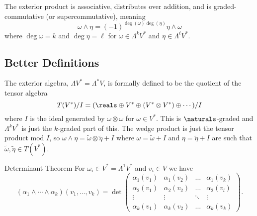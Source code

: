 \documentclass[fleqn]{NotesClass}
\begin{document}
    \begin{lma}{}{}
        The exterior product is associative, distributes over addition, and is graded-commutative (or supercommutative), meaning
        \begin{equation}
            \omega \wedge \eta = (-1)^{\deg(\omega) \deg(\eta)}\eta \wedge \omega
        \end{equation}
        where \(\deg \omega = k\) and \(\deg \eta = \ell\) for \(\omega \in \Lambda^kV^*\) and \(\eta \in \Lambda^\ell V^*\).
    \end{lma}
    
    \subsection{Better Definitions}
    The exterior algebra, \(\Lambda V^* = \Lambda^* V\), is formally defined to be the quotient of the tensor algebra
    \begin{equation}
        T(V^*)/I = (\reals \oplus V^* \oplus (V^* \otimes V^*) \oplus \dotsb)/I
    \end{equation}
    where \(I\) is the ideal generated by \(\omega \otimes \omega\) for \(\omega \in V^*\).
    This is \(\naturals\)-graded and \(\Lambda^kV^*\) is just the \(k\)-graded part of this.
    The wedge product is just the tensor product mod \(I\), so \(\omega \wedge \eta = \tilde{\omega} \otimes \tilde{\eta} + I\) where \(\omega = \tilde{\omega} + I\) and \(\eta = \tilde{\eta} + I\) are such that \(\tilde{\omega}, \tilde{\eta} \in T(V^*)\).
    
    \begin{thm}{Determinant Theorem}{}
        For \(\omega_i \in V^* = \Lambda^1V^*\) and \(v_i \in V\) we have
        \begin{equation}
            (\alpha_1 \wedge \dotsb \wedge \alpha_k)(v_1, \dotsc, v_k) = \det
            \begin{pmatrix}
                \alpha_1(v_1) & \alpha_1(v_2) & \dots & \alpha_1(v_k)\\
                \alpha_2(v_1) & \alpha_2(v_2) & \dots & \alpha_2(v_l)\\
                \vdots & \vdots & \ddots & \vdots\\
                \alpha_k(v_1) & \alpha_k(v_2) & \dots & \alpha_k(v_k)
            \end{pmatrix}
            .
        \end{equation}
    \end{thm}
    
\end{document}
